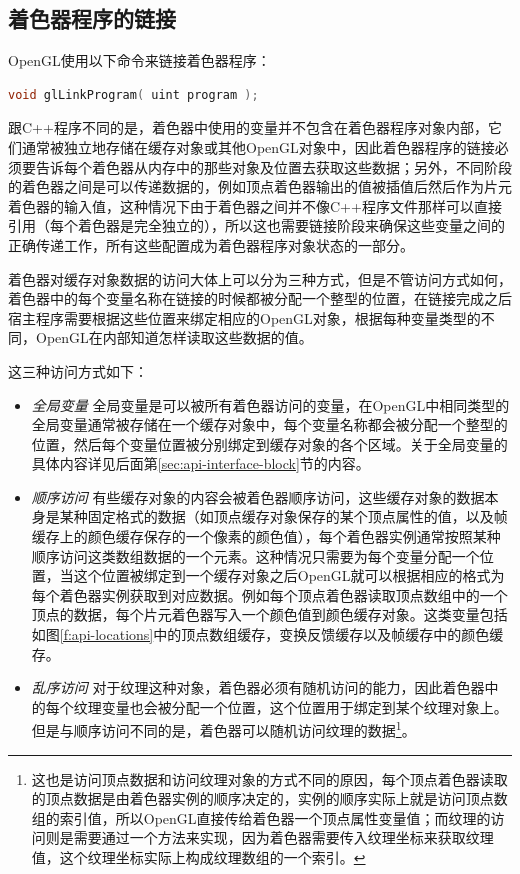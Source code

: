 \subsection{着色器程序的链接}
OpenGL使用以下命令来链接着色器程序：

\begin{lstlisting}[language=C++]
void glLinkProgram( uint program );
\end{lstlisting}

跟C++程序不同的是，着色器中使用的变量并不包含在着色器程序对象内部，它们通常被独立地存储在缓存对象或其他OpenGL对象中，因此着色器程序的链接必须要告诉每个着色器从内存中的那些对象及位置去获取这些数据；另外，不同阶段的着色器之间是可以传递数据的，例如顶点着色器输出的值被插值后然后作为片元着色器的输入值，这种情况下由于着色器之间并不像C++程序文件那样可以直接引用（每个着色器是完全独立的），所以这也需要链接阶段来确保这些变量之间的正确传递工作，所有这些配置成为着色器程序对象状态的一部分。

着色器对缓存对象数据的访问大体上可以分为三种方式，但是不管访问方式如何，着色器中的每个变量名称在链接的时候都被分配一个整型的位置，在链接完成之后宿主程序需要根据这些位置来绑定相应的OpenGL对象，根据每种变量类型的不同，OpenGL在内部知道怎样读取这些数据的值。

这三种访问方式如下：
\begin{itemize}
	\item \emph{全局变量 }全局变量是可以被所有着色器访问的变量，在OpenGL中相同类型的全局变量通常被存储在一个缓存对象中，每个变量名称都会被分配一个整型的位置，然后每个变量位置被分别绑定到缓存对象的各个区域。关于全局变量的具体内容详见后面第\ref{sec:api-interface-block}节的内容。
	\item \emph{顺序访问 }有些缓存对象的内容会被着色器顺序访问，这些缓存对象的数据本身是某种固定格式的数据（如顶点缓存对象保存的某个顶点属性的值，以及帧缓存上的颜色缓存保存的一个像素的颜色值），每个着色器实例通常按照某种顺序访问这类数组数据的一个元素。这种情况只需要为每个变量分配一个位置，当这个位置被绑定到一个缓存对象之后OpenGL就可以根据相应的格式为每个着色器实例获取到对应数据。例如每个顶点着色器读取顶点数组中的一个顶点的数据，每个片元着色器写入一个颜色值到颜色缓存对象。这类变量包括如图\ref{f:api-locations}中的顶点数组缓存，变换反馈缓存以及帧缓存中的颜色缓存。
	\item \emph{乱序访问 }对于纹理这种对象，着色器必须有随机访问的能力，因此着色器中的每个纹理变量也会被分配一个位置，这个位置用于绑定到某个纹理对象上。但是与顺序访问不同的是，着色器可以随机访问纹理的数据\footnote{这也是访问顶点数据和访问纹理对象的方式不同的原因，每个顶点着色器读取的顶点数据是由着色器实例的顺序决定的，实例的顺序实际上就是访问顶点数组的索引值，所以OpenGL直接传给着色器一个顶点属性变量值；而纹理的访问则是需要通过一个方法来实现，因为着色器需要传入纹理坐标来获取纹理值，这个纹理坐标实际上构成纹理数组的一个索引。}。
\end{itemize}

